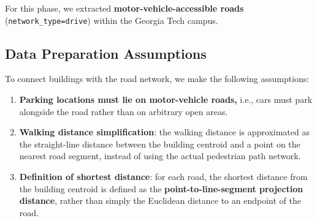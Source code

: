 \documentclass[fleqn,10pt]{olplainarticle}
\begin{document}
For this phase, we extracted \textbf{motor-vehicle-accessible roads} (\texttt{network\_type=drive}) within the Georgia Tech campus.

\subsection*{Data Preparation Assumptions}
To connect buildings with the road network, we make the following assumptions:
\begin{enumerate}
    \item \textbf{Parking locations must lie on motor-vehicle roads,} i.e., cars must park alongside the road rather than on arbitrary open areas.
    \item \textbf{Walking distance simplification}: the walking distance is approximated as the straight-line distance between the building centroid and a point on the nearest road segment, instead of using the actual pedestrian path network.
    \item \textbf{Definition of shortest distance}: for each road, the shortest distance from the building centroid is defined as the \textbf{point-to-line-segment projection distance}, rather than simply the Euclidean distance to an endpoint of the road.
\end{enumerate}
\end{document}
